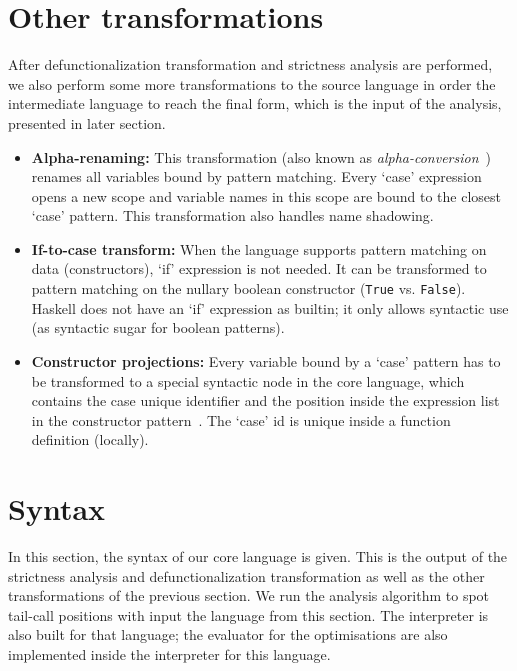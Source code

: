 \documentclass[diploma]{softlab-thesis}
\begin{document}
\section {Other transformations}
\label{sec:other-transformations}

After defunctionalization transformation and strictness analysis are performed, we also 
perform some more transformations to the source language in order the intermediate 
language to reach the final form, which is the input of the analysis, presented in later section.


\begin{itemize}
  \item \textbf{Alpha-renaming:}  This transformation (also known as \emph{alpha-conversion}~\cite{Barendregt:1993:LCT:162552.162561}) renames all variables bound by pattern matching.
  Every `case' expression opens a new scope and variable names in this scope are bound to the closest 
  `case' pattern. This transformation also handles name shadowing. 
  \item \textbf{If-to-case transform:}  When the language supports pattern matching on data 
  (constructors), `if' expression is not needed. It can be transformed to pattern matching on 
  the nullary boolean constructor (\texttt{True} vs. \texttt{False}). Haskell does not have an `if' expression as builtin; it only allows
  syntactic use (as syntactic sugar for boolean patterns).
  \item \textbf{Constructor projections:}  Every variable bound by a `case' pattern has to be 
  transformed to a special syntactic node in the core language, which contains the case unique identifier
  and the position inside the expression list in the constructor pattern~\cite{Fourtounis:2013:GIT:2769663.2769674}. The `case' id is 
  unique inside a function definition (locally).
\end{itemize}

\section{Syntax}
\label{sec:syntax}

In this section, the syntax of our core language is given.
This is the output of the strictness analysis and 
defunctionalization transformation as well as the other transformations of the previous 
section. We run the analysis algorithm to spot tail-call positions with input 
the language from this section. The interpreter is also built for that language; the evaluator for 
the optimisations are also implemented inside the interpreter for this language.
\end{document}
